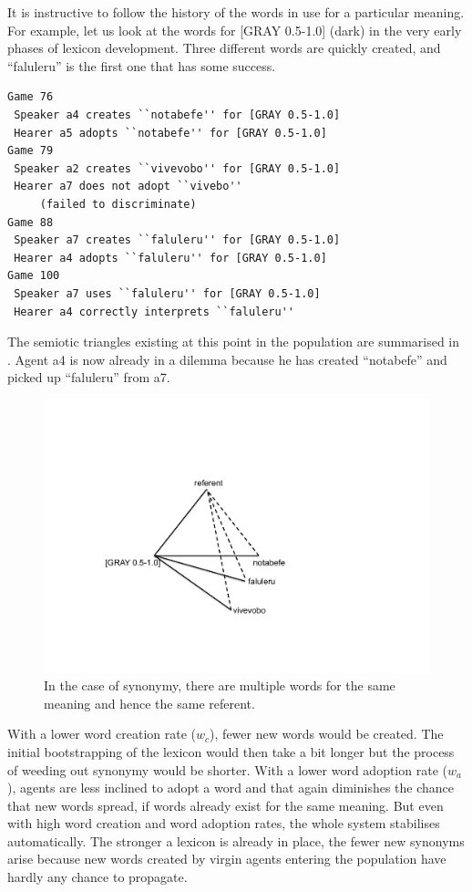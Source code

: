 It is instructive to follow the history of the words 
in use for a particular meaning. For 
example, let us look at the words for [GRAY 0.5-1.0] 
(dark) in the very early phases of lexicon development.
Three different words are quickly created, and 
``faluleru'' is the first one that has some success. 
\begin{verbatim}
Game 76
 Speaker a4 creates ``notabefe'' for [GRAY 0.5-1.0]
 Hearer a5 adopts ``notabefe'' for [GRAY 0.5-1.0]
Game 79 
 Speaker a2 creates ``vivevobo'' for [GRAY 0.5-1.0]
 Hearer a7 does not adopt ``vivebo'' 
     (failed to discriminate)
Game 88 
 Speaker a7 creates ``faluleru'' for [GRAY 0.5-1.0]
 Hearer a4 adopts ``faluleru'' for [GRAY 0.5-1.0]
Game 100 
 Speaker a7 uses ``faluleru'' for [GRAY 0.5-1.0]
 Hearer a4 correctly interprets ``faluleru''
\end{verbatim}
The semiotic triangles existing at this point in the population are 
summarised in . 
Agent {\bfshape  a4} is now already in a dilemma because he has created
``notabefe'' and picked up ``faluleru'' from {\bfshape  a7}. 


\begin{figure}[htbp]
  \centerline{\includegraphics[width=.50\textwidth]{chap6/figs/triangle6}}
\caption{\label{triangle6} In the case of synonymy, 
there are multiple words for the same meaning and hence the 
same referent.}
\end{figure}

With a lower word creation rate ($w_{c}$), 
fewer new words would be created. The initial bootstrapping
of the lexicon would then take a bit longer but the 
process of weeding out synonymy would be shorter. 
With a lower word adoption rate ($w_{a}$), agents are
less inclined to adopt a word and that again diminishes
the chance that new words spread, if words already 
exist for the same meaning. But even with high word creation
and word adoption rates, the whole system stabilises automatically. 
The stronger a lexicon is already in place, the fewer
new synonyms arise because new words
created by virgin agents entering the population have hardly 
any chance to propagate. 

